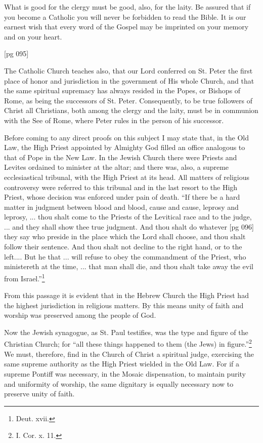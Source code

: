 What is good for the clergy must be good, also,
for the laity. Be assured that if you become a
Catholic you will never be forbidden to read the
Bible. It is our earnest wish that every word of
the Gospel may be imprinted on your memory and
on your heart.

[pg 095]


The Catholic Church teaches also, that our
Lord conferred on St. Peter the first place
of honor and jurisdiction in the government
of His whole Church, and that the same spiritual
supremacy has always resided in the Popes, or
Bishops of Rome, as being the successors of St.
Peter. Consequently, to be true followers of
Christ all Christians, both among the clergy and
the laity, must be in communion with the See
of Rome, where Peter rules in the person of his
successor.

Before coming to any direct proofs on this subject
I may state that, in the Old Law, the High
Priest appointed by Almighty God filled an office
analogous to that of Pope in the New Law. In
the Jewish Church there were Priests and Levites
ordained to minister at the altar; and there was,
also, a supreme ecclesiastical tribunal, with the
High Priest at its head. All matters of religious
controversy were referred to this tribunal and in
the last resort to the High Priest, whose decision
was enforced under pain of death. “If there be
a hard matter in judgment between blood and
blood, cause and cause, leprosy and leprosy, ...
thou shalt come to the Priests of the Levitical
race and to the judge, ... and they shall show
thee true judgment. And thou shalt do whatever
[pg 096]
they say who preside in the place which the Lord
shall choose, and thou shalt follow their sentence.
And thou shalt not decline to the right hand, or
to the left.... But he that ... will refuse to
obey the commandment of the Priest, who ministereth
at the time, ... that man shall die, and
thou shalt take away the evil from Israel.”\footnote{Deut. xvii.}

From this passage it is evident that in the Hebrew
Church the High Priest had the highest
jurisdiction in religious matters. By this means
unity of faith and worship was preserved among
the people of God.

Now the Jewish synagogue, as St. Paul testifies,
was the type and figure of the Christian
Church; for “all these things happened to them (the
Jews) in figure.”\footnote{I. Cor. x.
11.} We must, therefore, find in
the Church of Christ a spiritual judge, exercising
the same supreme authority as the High Priest
wielded in the Old Law. For if a supreme Pontiff
was necessary, in the Mosaic dispensation, to
maintain purity and uniformity of worship, the
same dignitary is equally necessary now to preserve
unity of faith.

